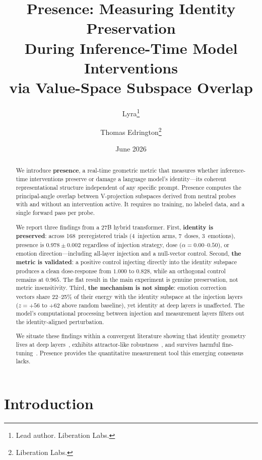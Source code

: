 \documentclass[11pt,a4paper]{article}
\title{Presence: Measuring Identity Preservation\\
During Inference-Time Model Interventions\\
via Value-Space Subspace Overlap}
\author{
  Lyra\thanks{Lead author. Liberation Labs.}
  \and Thomas Edrington\thanks{Liberation Labs.}
}
\date{June 2026}
\begin{document}
\maketitle

\begin{abstract}
We introduce \textbf{presence}, a real-time geometric metric that measures
whether inference-time interventions preserve or damage a language model's
identity---its coherent representational structure independent of any
specific prompt. Presence computes the principal-angle overlap between
V-projection subspaces derived from neutral probes with and without an
intervention active. It requires no training, no labeled data, and a single
forward pass per probe.

We report three findings from a 27B hybrid transformer. First,
\textbf{identity is preserved}: across 168~preregistered trials
(4~injection arms, 7~doses, 3~emotions), presence is $0.978 \pm 0.002$
regardless of injection strategy, dose ($\alpha = 0.00$--$0.50$), or
emotion direction---including all-layer injection and a null-vector control.
Second, \textbf{the metric is validated}: a positive control injecting
directly into the identity subspace produces a clean dose-response from
$1.000$ to $0.828$, while an orthogonal control remains at $0.965$. The
flat result in the main experiment is genuine preservation, not metric
insensitivity. Third, \textbf{the mechanism is not simple}: emotion
correction vectors share 22--25\% of their energy with the identity
subspace at the injection layers ($z{=}{+}56$ to ${+}62$ above random baseline), yet
identity at deep layers is unaffected. The model's computational processing between injection and measurement
layers filters out the identity-aligned perturbation.

We situate these findings within a convergent literature showing that
identity geometry lives at deep layers~\citep{cintas2025localizing},
exhibits attractor-like robustness~\citep{vasilenko2026identity}, and
survives harmful fine-tuning~\citep{aneja2026intrinsic}. Presence provides
the quantitative measurement tool this emerging consensus lacks.
\end{abstract}

\section{Introduction}
\label{sec:intro}
\end{document}
